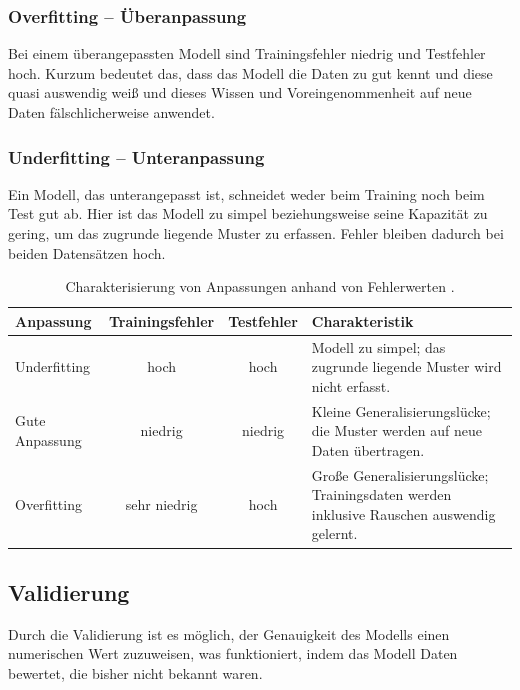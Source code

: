 \subsubsection{Overfitting -- Überanpassung}

Bei einem überangepassten Modell sind Trainingsfehler niedrig und Testfehler hoch. Kurzum bedeutet das, dass das Modell die Daten zu gut kennt und diese quasi auswendig weiß und dieses Wissen und Voreingenommenheit auf neue Daten fälschlicherweise anwendet.

\subsubsection{Underfitting -- Unteranpassung}

Ein Modell, das unterangepasst ist, schneidet weder beim Training noch beim Test gut ab. Hier ist das Modell zu simpel beziehungsweise seine Kapazität zu gering, um das zugrunde liegende Muster zu erfassen. Fehler bleiben dadurch bei beiden Datensätzen hoch.

\begin{table}[htbp]
  \centering
  \begin{tabularx}{\textwidth}{@{}l c c X@{}}
    \toprule
    \textbf{Anpassung} & \textbf{Trainingsfehler} & \textbf{Testfehler} &
    \textbf{Charakteristik} \\
    \midrule
    Underfitting & hoch & hoch & Modell
    zu simpel; das zugrunde liegende Muster wird nicht erfasst. \\
    \addlinespace
    Gute Anpassung & niedrig  & niedrig &
    Kleine Generalisierungslücke; die Muster werden auf neue Daten
    übertragen. \\
    \addlinespace
    Overfitting & sehr niedrig & hoch &
    Große Generalisierungslücke; Trainingsdaten werden inklusive Rauschen
    auswendig gelernt. \\
    \bottomrule
  \end{tabularx}
  \caption{Charakterisierung von Anpassungen anhand von Fehlerwerten \parencite[Kap. 7.2]{hastie2009elements}.}
  \label{tab:fitting}
\end{table}

\subsection{Validierung}

Durch die Validierung ist es möglich, der Genauigkeit des Modells einen numerischen Wert zuzuweisen, was funktioniert, indem das Modell Daten bewertet, die bisher nicht bekannt waren.

